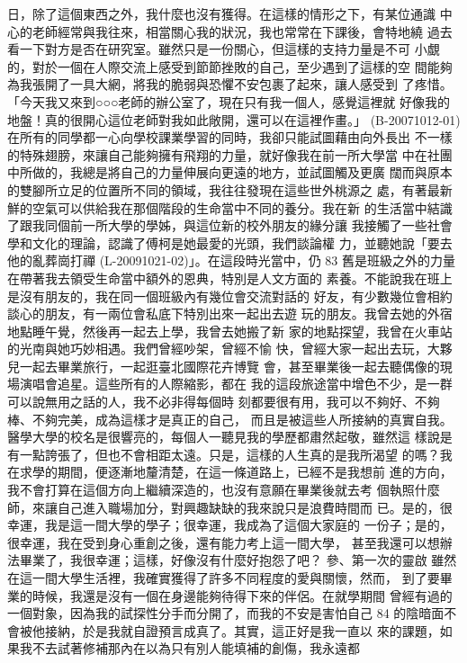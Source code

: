 日，除了這個東西之外，我什麼也沒有獲得。在這樣的情形之下，有某位通識
中心的老師經常與我往來，相當關心我的狀況，我也常常在下課後，會特地繞
過去看一下對方是否在研究室。雖然只是一份關心，但這樣的支持力量是不可
小覷的，對於一個在人際交流上感受到節節挫敗的自己，至少遇到了這樣的空
間能夠為我張開了一具大網，將我的脆弱與恐懼不安包裹了起來，讓人感受到
了疼惜。 
「今天我又來到○○○老師的辦公室了，現在只有我一個人，感覺這裡就
好像我的地盤！真的很開心這位老師對我如此敞開，還可以在這裡作畫。」
(B-20071012-01) 
在所有的同學都一心向學校課業學習的同時，我卻只能試圖藉由向外長出
不一樣的特殊翅膀，來讓自己能夠擁有飛翔的力量，就好像我在前一所大學當
中在社團中所做的，我總是將自己的力量伸展向更遠的地方，並試圖觸及更廣
闊而與原本的雙腳所立足的位置所不同的領域，我往往發現在這些世外桃源之
處，有著最新鮮的空氣可以供給我在那個階段的生命當中不同的養分。我在新
的生活當中結識了跟我同個前一所大學的學姊，與這位新的校外朋友的緣分讓
我接觸了一些社會學和文化的理論，認識了傅柯是她最愛的光頭，我們談論權
力，並聽她說「要去他的亂葬崗打禪 (L-20091021-02)」。在這段時光當中，仍
83 
舊是班級之外的力量在帶著我去領受生命當中額外的恩典，特別是人文方面的
素養。不能說我在班上是沒有朋友的，我在同一個班級內有幾位會交流對話的
好友，有少數幾位會相約談心的朋友，有一兩位會私底下特別出來一起出去遊
玩的朋友。我曾去她的外宿地點睡午覺，然後再一起去上學，我曾去她搬了新
家的地點探望，我曾在火車站的光南與她巧妙相遇。我們曾經吵架，曾經不愉
快，曾經大家一起出去玩，大夥兒一起去畢業旅行，一起逛臺北國際花卉博覽
會，甚至畢業後一起去聽偶像的現場演唱會追星。這些所有的人際縮影，都在
我的這段旅途當中增色不少，是一群可以說無用之話的人，我不必非得每個時
刻都要很有用，我可以不夠好、不夠棒、不夠完美，成為這樣才是真正的自己，
而且是被這些人所接納的真實自我。 
醫學大學的校名是很響亮的，每個人一聽見我的學歷都肅然起敬，雖然這
樣說是有一點誇張了，但也不會相距太遠。只是，這樣的人生真的是我所渴望
的嗎？我在求學的期間，便逐漸地釐清楚，在這一條道路上，已經不是我想前
進的方向，我不會打算在這個方向上繼續深造的，也沒有意願在畢業後就去考
個執照什麼師，來讓自己進入職場加分，對興趣缺缺的我來說只是浪費時間而
已。是的，很幸運，我是這一間大學的學子；很幸運，我成為了這個大家庭的
一份子；是的，很幸運，我在受到身心重創之後，還有能力考上這一間大學，
甚至我還可以想辦法畢業了，我很幸運；這樣，好像沒有什麼好抱怨了吧？ 
參、第一次的靈啟 
雖然在這一間大學生活裡，我確實獲得了許多不同程度的愛與關懷，然而，
到了要畢業的時候，我還是沒有一個在身邊能夠待得下來的伴侶。在就學期間
曾經有過的一個對象，因為我的試探性分手而分開了，而我的不安是害怕自己
84 
的陰暗面不會被他接納，於是我就自證預言成真了。其實，這正好是我一直以
來的課題，如果我不去試著修補那內在以為只有別人能填補的創傷，我永遠都
